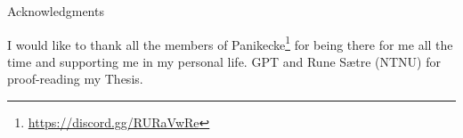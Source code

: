 \thispagestyle{empty}

\vspace*{20mm}

\begin{center}
    { Acknowledgments}
\end{center}

\vspace{10mm}

I would like to thank all the members of Panikecke\footnote{\url{https://discord.gg/RURaVwRe}} for being there for me all the time and supporting me in my personal life.
GPT and Rune S{\ae}tre (NTNU) for proof-reading my Thesis.

\cleardoublepage{}

